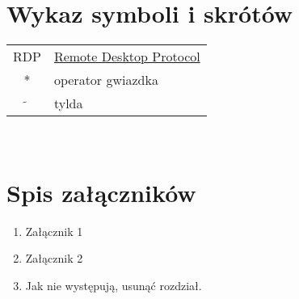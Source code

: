 \documentclass[a4paper,11pt,twoside]{report}
\theoremstyle{definition}
\begin{document}





\thispagestyle{empty}


\chapter*{Wykaz symboli i skrótów}

\begin{tabular}{cl}
  RDP            & \href{https://docs.microsoft.com/pl-pl/windows/win32/termserv/remote-desktop-protocol?redirectedfrom=MSDN}{Remote Desktop Protocol} \\
  *              & operator gwiazdka                                                                                                                   \\
  $\widetilde{}$ & tylda
\end{tabular}
\\
\thispagestyle{empty}


\listoffigures
\thispagestyle{empty}


\renewcommand{\listtablename}{Spis tabel}
\listoftables
\thispagestyle{empty}



\chapter*{Spis załączników}
\begin{enumerate}
  \item Załącznik 1
  \item Załącznik 2
  \item Jak nie występują, usunąć rozdział.
\end{enumerate}
\thispagestyle{empty}
\end{document}
